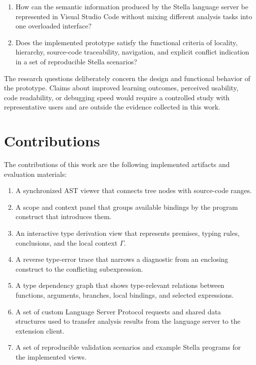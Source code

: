 \begin{enumerate}[label=\textbf{RQ\arabic*:}, leftmargin=*]
    \item How can the semantic information produced by the Stella language server be represented in Visual Studio Code without mixing different analysis tasks into one overloaded interface?
    \item Does the implemented prototype satisfy the functional criteria of locality, hierarchy, source-code traceability, navigation, and explicit conflict indication in a set of reproducible Stella scenarios?
\end{enumerate}

The research questions deliberately concern the design and functional behavior of the prototype. Claims about improved learning outcomes, perceived usability, code readability, or debugging speed would require a controlled study with representative users and are outside the evidence collected in this work.

\section{Contributions}

The contributions of this work are the following implemented artifacts and evaluation materials:

\begin{enumerate}
    \item A synchronized AST viewer that connects tree nodes with source-code ranges.
    \item A scope and context panel that groups available bindings by the program construct that introduces them.
    \item An interactive type derivation view that represents premises, typing rules, conclusions, and the local context $\Gamma$.
    \item A reverse type-error trace that narrows a diagnostic from an enclosing construct to the conflicting subexpression.
    \item A type dependency graph that shows type-relevant relations between functions, arguments, branches, local bindings, and selected expressions.
    \item A set of custom Language Server Protocol requests and shared data structures used to transfer analysis results from the language server to the extension client.
    \item A set of reproducible validation scenarios and example Stella programs for the implemented views.
\end{enumerate}


